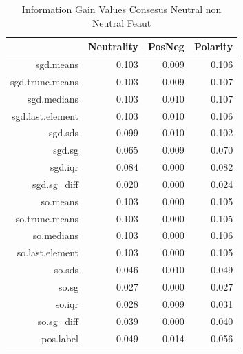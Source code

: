 \documentclass{sig-alternate}
\begin{document}
\begin{table}[ht]
\centering
\begin{tabular}{rrrr}
  \hline
 & Neutrality & PosNeg & Polarity \\ 
  \hline
sgd.means & 0.103 & 0.009 & 0.106 \\ 
  sgd.trunc.means & 0.103 & 0.009 & 0.107 \\ 
  sgd.medians & 0.103 & 0.010 & 0.107 \\ 
  sgd.last.element & 0.103 & 0.010 & 0.106 \\ 
  sgd.sds & 0.099 & 0.010 & 0.102 \\ 
  sgd.sg & 0.065 & 0.009 & 0.070 \\ 
  sgd.iqr & 0.084 & 0.000 & 0.082 \\ 
  sgd.sg\_diff & 0.020 & 0.000 & 0.024 \\ 
  so.means & 0.103 & 0.000 & 0.105 \\ 
  so.trunc.means & 0.103 & 0.000 & 0.105 \\ 
  so.medians & 0.103 & 0.000 & 0.106 \\ 
  so.last.element & 0.103 & 0.000 & 0.105 \\ 
  so.sds & 0.046 & 0.010 & 0.049 \\ 
  so.sg & 0.027 & 0.000 & 0.027 \\ 
  so.iqr & 0.028 & 0.009 & 0.031 \\ 
  so.sg\_diff & 0.039 & 0.000 & 0.040 \\ 
  pos.label & 0.049 & 0.014 & 0.056 \\ 
   \hline
\end{tabular}
\caption{Information Gain Values Consesus Neutral non Neutral Feaut} 
\end{table}
\end{document}
